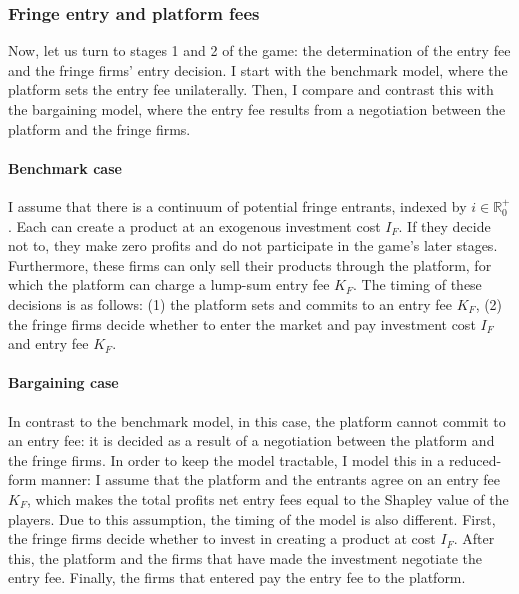\subsubsection{Fringe entry and platform fees}

Now, let us turn to stages 1 and 2 of the game: the determination of the entry fee and the fringe firms' entry decision.
I start with the benchmark model, where the platform sets the entry fee unilaterally.
Then, I compare and contrast this with the bargaining model, where the entry fee results from a negotiation between the platform and the fringe firms.

\paragraph{Benchmark case}

I assume that there is a continuum of potential fringe entrants, indexed by $i \in \mathbb{R}^+_0$.
Each can create a product at an exogenous investment cost $I_F$.
If they decide not to, they make zero profits and do not participate in the game's later stages.
Furthermore, these firms can only sell their products through the platform, for which the platform can charge a lump-sum entry fee $K_F$.
The timing of these decisions is as follows: (1) the platform sets and commits to an entry fee $K_F$, (2) the fringe firms decide whether to enter the market and pay investment cost $I_F$ and entry fee $K_F$.

\paragraph{Bargaining case}
\label{sec:model_bargaining}

In contrast to the benchmark model, in this case, the platform cannot commit to an entry fee: it is decided as a result of a negotiation between the platform and the fringe firms.
In order to keep the model tractable, I model this in a reduced-form manner: I assume that the platform and the entrants agree on an entry fee $K_F$, which makes the total profits net entry fees equal to the Shapley value of the players.
Due to this assumption, the timing of the model is also different.
First, the fringe firms decide whether to invest in creating a product at cost $I_F$.
After this, the platform and the firms that have made the investment negotiate the entry fee.
Finally, the firms that entered pay the entry fee to the platform.


